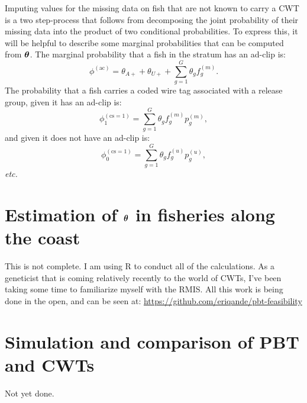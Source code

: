 \documentclass[11pt]{article}
\makeatletter
\def\bm#1{\mathpalette\bmstyle{#1}}
\def\bmstyle#1#2{\mbox{\boldmath$#1#2$}}
\newcommand{\etc}{{\em etc.}\@\xspace}
\newcommand{\btheta}{\bm{\theta}}
\makeatother
\begin{document}
Imputing values for the missing data on fish that are not known to carry a CWT is a two step-process that follows
from decomposing the joint probability of their missing data into the product of two conditional probabilities.
To express this, it will be helpful to describe some marginal probabilities that can be computed from $\btheta$.  The marginal probability that a fish in the stratum has an ad-clip is:
\[
\phi^{(\mathrm{ac})} = \theta_{A+} + \theta_{U+} + \sum_{g=1}^G \theta_g f^{(m)}_g.
\]
The probability that a fish carries a coded wire tag associated with a release group, given it has an ad-clip is:
\[
\phi^{(\mathrm{cs}=1)}_1 =  \sum_{g=1}^G \theta_g f^{(m)}_g p^{(m)}_g,
\]
and given it does not have an ad-clip is:
\[
\phi^{(\mathrm{cs}=1)}_0 =  \sum_{g=1}^G \theta_g f^{(u)}_g p^{(u)}_g,
\]
\etc




\section{Estimation of $\btheta$ in fisheries along the coast}
This is not complete.  I am using R to conduct all of the calculations.  As a geneticist that is coming relatively
recently to the world of CWTs, I've been taking some time to familiarize myself with the RMIS.  All this work
is being done in the open, and can be seen at: \url{https://github.com/eriqande/pbt-feasibility}


\section{Simulation and comparison of PBT and CWTs}

Not yet done.



 
\end{document}
